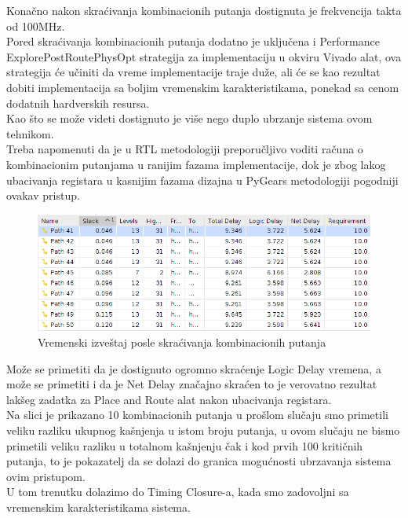 Konačno nakon skraćivanja kombinacionih putanja dostignuta je frekvencija takta
od 100MHz.\\
Pored skraćivanja kombinacionih putanja dodatno je uključena i
Performance ExplorePostRoutePhysOpt strategija za implementaciju u okviru
Vivado alat, ova strategija će učiniti da vreme implementacije traje duže, ali
će se kao rezultat dobiti implementacija sa boljim vremenskim karakteristikama,
ponekad sa cenom dodatnih hardverskih resursa. \\

Kao što se može videti dostignuto je više nego duplo ubrzanje sistema ovom tehnikom. \\
Treba napomenuti da je u RTL metodologiji preporučljivo voditi računa o
kombinacionim putanjama u ranijim fazama implementacije, dok je zbog lakog
ubacivanja registara u kasnijim fazama dizajna u PyGears metodologiji
pogodniji ovakav pristup. \\

\begin{figure}[H]
  \centering
  \includegraphics[width=1\linewidth]{results/implementation/pygears_fast/timing.png}
  \caption{Vremenski izveštaj posle skraćivanja kombinacionih putanja}
  \label{slow_time}
\end{figure}

Može se primetiti da je dostignuto ogromno skraćenje Logic Delay vremena, a
može se  primetiti i da je Net Delay značajno skraćen to je verovatno rezultat
lakšeg zadatka za Place and Route alat nakon ubacivanja registara. \\
Na slici je prikazano 10 kombinacionih putanja u prošlom slučaju smo primetili
veliku razliku ukupnog kašnjenja u istom broju putanja, u ovom slučaju ne bismo
primetili veliku razliku u totalnom kašnjenju čak i kod prvih 100 kritičnih
putanja, to je pokazatelj da se dolazi do granica mogućnosti ubrzavanja sistema
ovim pristupom. \\
U tom trenutku dolazimo do Timing Closure-a, kada smo zadovoljni sa vremenskim
karakteristikama sistema. \\

